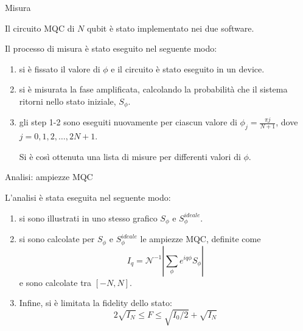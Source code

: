 \documentclass{beamer}
\renewcommand{\'}[0]{\`}
\begin{document}
	
	\begin{frame}{Misura}

Il circuito MQC di \alert{$N$} qubit è stato implementato nei due software. \pause
\vspace{0.5cm}


Il processo di misura è stato eseguito nel seguente modo: \pause

\begin{enumerate}
\item si è fissato il valore di \alert{$\phi$} e il circuito è stato eseguito in un device.  \pause
\item si è misurata  la fase amplificata, calcolando la probabilità che il sistema ritorni nello stato iniziale,  \alert{$ S_{\phi}$}. \pause
\item gli step 1-2 sono eseguiti nuovamente per ciascun valore di $\phi_j = \frac{ \pi j }{N+1}$, dove $j=0,1,2,\dots,2N+1$. 

Si è così ottenuta una lista di misure per \alert{differenti} valori di $\phi$.

\end{enumerate}

	\end{frame}
	
	\begin{frame}{Analisi: ampiezze MQC}

L'analisi è stata eseguita nel seguente modo: \pause

\begin{enumerate}
\item si sono illustrati in uno stesso grafico \alert{$ S_{\phi}$} e \alert{$ S_{\phi}^{ideale}$}. \pause
\item si sono calcolate per $ S_{\phi}$ e $ S_{\phi}^{ideale}$ le \alert{ampiezze MQC}, definite come
 \begin{equation*}
I_{q}= \mathcal{N}^{-1} | \sum_{\phi} e^{i q \phi} S_{\phi} | 
\end{equation*} 
e sono calcolate tra $[-N,N]$. \pause
\item Infine, si è limitata la \alert{fidelity} dello stato: 
\begin{equation*}
 2 \sqrt{I_N} \leq F \leq \sqrt{I_0/2} + \sqrt{I_N}
 \label{Fidelity_Bounded}
 \end{equation*}

\end{enumerate}


	
	\end{frame}
\end{document}
